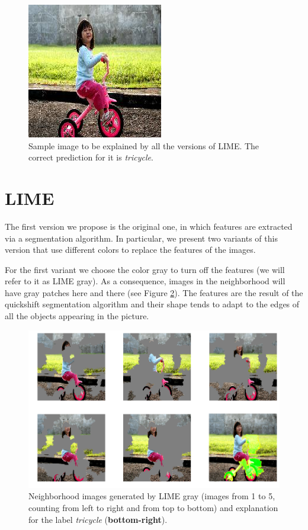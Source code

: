 \documentclass[12pt, twoside, a4paper]{report}
\begin{document}
\begin{figure}
\begin{center}
\includegraphics[scale=1]{images/tricycle.JPEG} 
\caption{Sample image to be explained by all the versions of LIME. The correct prediction for it is \emph{tricycle}.}
\label{fig:tricycle}
\end{center}
\end{figure}

\section{LIME}

The first version we propose is the original one, in which features are extracted via a segmentation algorithm. In particular, we present two variants of this version that use different colors to replace the features of the images.

For the first variant we choose the color gray to turn off the features (we will refer to it as LIME gray). As a consequence, images in the neighborhood will have gray patches here and there (see Figure \ref{fig:lime_neigh}). The features are the result of the quickshift segmentation algorithm and their shape tends to adapt to the edges of all the objects appearing in the picture.

\begin{figure}
\begin{center}
\includegraphics[width = .85\textwidth]{images/lime_neighborhood.png} 
\caption{Neighborhood images generated by LIME gray (images from 1 to 5, counting from left to right and from top to bottom) and explanation for the label \textit{tricycle} (\textbf{bottom-right}).}
\label{fig:lime_neigh}
\end{center}
\end{figure}
\end{document}
